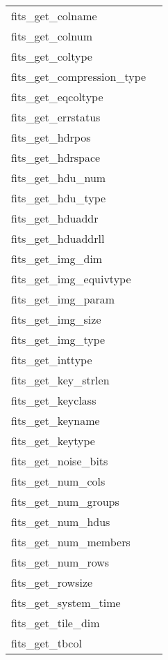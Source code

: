 \documentclass[11pt]{book}
\begin{document}
\begin{tabular}{lr}
fits\_get\_colname    & \pageref{ffgcnn} \\
fits\_get\_colnum     & \pageref{ffgcno} \\
fits\_get\_coltype    & \pageref{ffgtcl} \\
fits\_get\_compression\_type & \pageref{ffgetcomp} \\
fits\_get\_eqcoltype    & \pageref{ffgtcl} \\
fits\_get\_errstatus  & \pageref{ffgerr} \\
fits\_get\_hdrpos        & \pageref{ffghps} \\
fits\_get\_hdrspace      & \pageref{ffghsp} \\
fits\_get\_hdu\_num    & \pageref{ffghdn} \\
fits\_get\_hdu\_type   & \pageref{ffghdt} \\
fits\_get\_hduaddr    & \pageref{ffghad} \\
fits\_get\_hduaddrll    & \pageref{ffghad} \\
fits\_get\_img\_dim & \pageref{ffgidm} \\
fits\_get\_img\_equivtype & \pageref{ffgidt} \\
fits\_get\_img\_param & \pageref{ffgipr} \\
fits\_get\_img\_size & \pageref{ffgisz} \\
fits\_get\_img\_type & \pageref{ffgidt} \\
fits\_get\_inttype    & \pageref{ffinttyp} \\
fits\_get\_key\_strlen & \pageref{ffgksl} \\
fits\_get\_keyclass    & \pageref{ffgkcl} \\
fits\_get\_keyname    & \pageref{ffgknm} \\
fits\_get\_keytype    & \pageref{ffdtyp} \\
fits\_get\_noise\_bits   & \pageref{ffgetcomp} \\
fits\_get\_num\_cols     & \pageref{ffgnrw} \\
fits\_get\_num\_groups  & \pageref{ffgmng} \\
fits\_get\_num\_hdus   & \pageref{ffthdu} \\
fits\_get\_num\_members  & \pageref{ffgtnm} \\
fits\_get\_num\_rows     & \pageref{ffgnrw} \\
fits\_get\_rowsize    & \pageref{ffgrsz} \\
fits\_get\_system\_time  & \pageref{ffdt2s} \\
fits\_get\_tile\_dim     & \pageref{ffgetcomp} \\
fits\_get\_tbcol      & \pageref{ffgabc} \\
\end{tabular}
\end{document}
